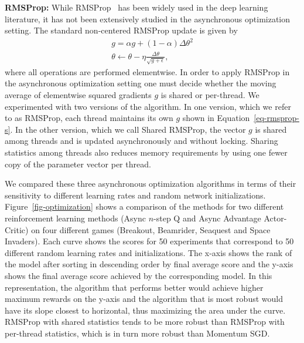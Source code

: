 \documentclass{article} %
\begin{document}
\textbf{RMSProp:} While RMSProp~\citep{tieleman2012lecture} has been widely used in the deep learning literature, it has not been extensively studied in the asynchronous optimization setting.  The standard non-centered RMSProp update is given by
\begin{eqnarray}
    \label{eq-rmsprop-s}
    g = \alpha g + (1-\alpha)\Delta\theta^2 \\
    \theta \gets \theta - \eta \frac{\Delta\theta}{\sqrt{g+\epsilon}},
\end{eqnarray}
where all operations are performed elementwise.
In order to apply RMSProp in the asynchronous optimization setting one must decide whether the moving average of elementwise squared gradients $g$ is shared or per-thread.
We experimented with two versions of the algorithm.
In one version, which we refer to as RMSProp, each thread maintains its own $g$ shown in Equation~\ref{eq-rmsprop-s}.
In the other version, which we call Shared RMSProp, the vector $g$ is shared among threads and is updated asynchronously and without locking.
%
Sharing statistics among threads also reduces memory requirements by using one fewer copy of the parameter vector per thread.

We compared these three asynchronous optimization algorithms in terms of their sensitivity to different learning rates and random network initializations.
%
%
%
Figure~\ref{fig-optimization} shows a comparison of the methods for two different reinforcement learning methods (Async $n$-step Q and Async Advantage Actor-Critic) on four different games (Breakout, Beamrider, Seaquest and Space Invaders).
Each curve shows the scores for 50 experiments that correspond to 50 different random learning rates and initializations.
The x-axis shows the rank of the model after sorting in descending order by final average score and the y-axis shows the final average score achieved by the corresponding model.
In this representation, the algorithm that performs better would achieve higher maximum rewards on the y-axis and the algorithm that is most robust would have its slope closest to horizontal, thus maximizing the area under the curve.
RMSProp with shared statistics tends to be more robust than RMSProp with per-thread statistics, which is in turn more robust than Momentum SGD.
\end{document}
